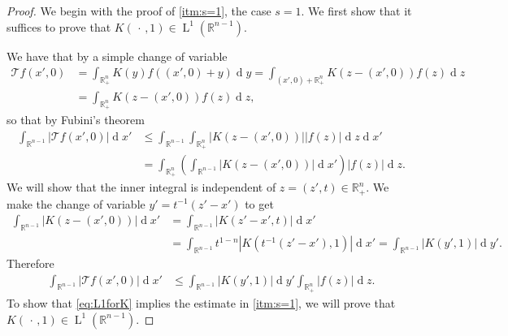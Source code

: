 \documentclass[a4paper,10pt]{amsart}
\newcommand{\R}{\mathbb R}
\renewcommand{\leq}{\leqslant}
\newcommand{\dif}{\mathrm{d}}
\renewcommand{\dif}{\operatorname{d}\!}
\newcommand{\lebe}{\operatorname{L}}
\numberwithin{equation}{section}
\theoremstyle{remark}
\numberwithin{equation}{section}
\begin{document}
	\begin{proof}
		We begin with the proof of \ref{itm:s=1}, the case $s=1$. We first show that it suffices to prove that $K(\,\cdot\,,1)\in\lebe^1 (\R^{n-1})$. 
		
		We have that by a simple change of variable
		\begin{align*}
			\mathcal{T}f(x',0)&=\int_{\R^{n}_+}K(y)f((x',0)+y)\dif y=\int_{(x',0)+\R^{n}_+}K(z-(x',0))f(z)\dif z\\
			&=\int_{\R^{n}_+}K(z-(x',0))f(z)\dif z,
		\end{align*}
		so that by Fubini's theorem
		\begin{align*}
			\int_{\R^{n-1}} |\mathcal{T}f(x',0)|\dif x' &\leq \int_{\R^{n-1}}\int_{\R^n_+}|K(z-(x',0))||f(z)|\dif z   \dif x'\\
			&=\int_{\R^n_+}\left( \int_{\R^{n-1}}|K(z-(x',0))|\dif x'\right) |f(z)|   \dif z.
		\end{align*}
		We will show that the inner integral is independent of $z=(z',t)\in\R^n_+$. We make the change of variable $y'=t^{-1}(z'-x')$ to get
		\begin{align*}
			\int_{\R^{n-1}}|K(z-(x',0))|\dif x'&=\int_{\R^{n-1}}|K(z'-x',t)|\dif x'\\
			&=\int_{\R^{n-1}}t^{1-n}|K(t^{-1}(z'-x'),1)|\dif x'=\int_{\R^{n-1}}|K(y',1)|\dif y'.
		\end{align*}
		Therefore 
		\begin{align}\label{eq:L1forK}
			\int_{\R^{n-1}} |\mathcal{T}f(x',0)|\dif x' &\leq \int_{\R^{n-1}}|K(y',1)|\dif y' \int_{\R^n_+} |f(z)|\dif z.
		\end{align}
		To show that \eqref{eq:L1forK} implies the estimate in \ref{itm:s=1}, we will prove that $K(\,\cdot\,,1)\in\lebe^1 (\R^{n-1})$.
		

\end{proof}
\end{document}
